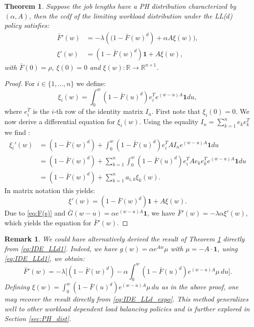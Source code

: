 \documentclass[12pt]{report}
\newcommand{\R}{\mathbb{R}}
\newtheorem{theorem}{Theorem}
\newtheorem{remark}{Remark}
\begin{document}
\begin{theorem}\label{eig:PHD}
Suppose the job lengths have a PH distribution characterized by $(\alpha,A)$, then the ccdf of the 
limiting workload distribution under the LL($d$) policy satisfies:
\begin{align*}
\bar{F}'(w) & = -\lambda \left((1-\bar{F}(w)^d\right) + \alpha A \xi(w)),\\
\xi'(w) & = \left(1-\bar{F}(w)^d\right) \textbf{1} + A \xi(w),
\end{align*}
with $\bar{F}(0) = \rho$, $\xi(0) = 0$ and
$\xi(w): \R \rightarrow \R^{n \times 1}$.
\end{theorem}
\begin{proof}
For $i \in \{1,\dots,n\}$ we define:
$$
\xi_{i}(w) = \int_0^w (1-\bar{F}(u)^d) e_i^T e^{(w-u)A} \textbf{1} du,
$$
where $e^T_i$ is the $i$-th row of the identity matrix $I_n$.
First note that $\xi_{i}(0) = 0$. We now derive a differential equation for $\xi_{i}(w)$. 
Using the equality $I_n = \sum_{k=1}^n e_k e_k^T$ we find :
\begin{align*}
\xi_{i}'(w)
&= (1-\bar{F}(w)^d) + \int_0^w (1 - \bar{F}(u)^d) e_i^T A I_n e^{(w-u)A} \textbf{1} du\\
&= (1-\bar{F}(w)^d) + \sum_{k=1}^n \int_0^w (1-\bar{F}(u)^d) e_i^T A e_k e_k^T e^{(w-u)A}\textbf{1} du \\
&= (1-\bar{F}(w)^d) + \sum_{k=1}^n a_{i,k} \xi_{k}(w).
\end{align*}
In matrix notation this yields:
$$
\xi'(w) = (1-\bar{F}(w)^d) \textbf{1} + A \xi(w).
$$
Due to \eqref{eq:F(s)} and $\bar G(w-u) = \alpha e^{(w-u)A} \textbf{1}$, 
we have $\bar{F}'(w) = -\lambda \alpha \xi'(w)$, which yields the equation for $\bar{F}'(w)$.
\end{proof}
\begin{remark}
We could have alternatively derived the result of Theorem \ref{eig:PHD} directly from \eqref{eq:IDE_LLd1}. Indeed, we have $g(w)=\alpha e^{Aw} \mu$ with $\mu=-A\cdot \textbf{1}$, using \eqref{eq:IDE_LLd1}, we obtain:
\begin{equation} \label{eq:IDE_LLd_expo}
\bar F'(w) = -\lambda\bigg[
(1-\bar F(w)^d) - \alpha \int_0^w (1-\bar F(u)^d) e^{(w-u) A} \mu \, du
\bigg].
\end{equation}
Defining $\xi(w)=\int_0^w (1 - \bar F(u)^d) e^{(w-u)A} \mu \, du$ as in the above proof, one may recover the result directly from \eqref{eq:IDE_LLd_expo}.
This method generalizes well to other workload dependent load balancing policies and is further explored in Section \ref{sec:PH_dist}.
\end{remark}
\end{document}
